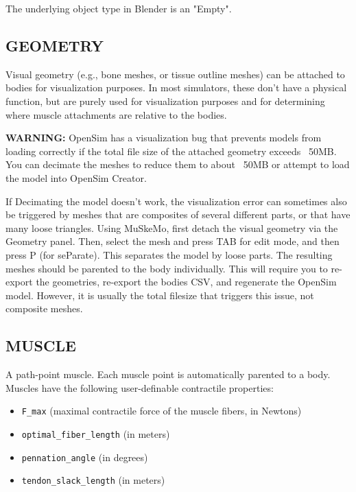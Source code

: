\documentclass{article}
\begin{document}
The underlying object type in Blender is an "Empty".

\subsection{GEOMETRY}
\label{sec:geometry}

Visual geometry (e.g., bone meshes, or tissue outline meshes) can be attached to bodies for visualization purposes. In most simulators, these don't have a physical function, but are purely used for visualization purposes and for determining where muscle attachments are relative to the bodies. 

\textbf{WARNING:} OpenSim has a visualization bug that prevents models from loading correctly if the total file size of the attached geometry exceeds ~50MB. You can decimate the meshes to reduce them to about ~50MB or attempt to load the model into OpenSim Creator.

If Decimating the model doesn't work, the visualization error can sometimes also be triggered by meshes that are composites of several different parts, or that have many loose triangles. Using MuSkeMo, first detach the visual geometry via the Geometry panel. Then, select the mesh and press TAB for edit mode, and then press P (for seParate). This separates the model by loose parts. The resulting meshes should be  parented to the body individually. 
This will require you to re-export the geometries, re-export the bodies CSV, and regenerate the OpenSim model. However, it is usually the total filesize that triggers this issue, not composite meshes.

\subsection{MUSCLE}
\label{sec:muscle}
A path-point muscle. Each muscle point is automatically parented to a body. Muscles have the following user-definable contractile properties:

\begin{itemize}
    \item \texttt{F\_max} (maximal contractile force of the muscle fibers, in Newtons)
    \item \texttt{optimal\_fiber\_length} (in meters)
    \item \texttt{pennation\_angle} (in degrees)
    \item \texttt{tendon\_slack\_length} (in meters)
\end{itemize}
\end{document}
